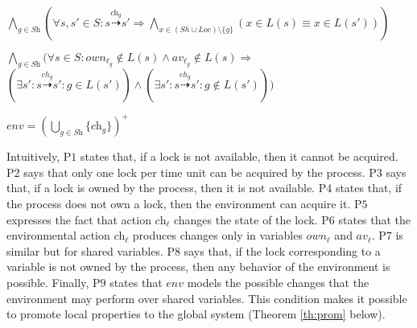 \begin{description}[font=\normalfont]
	\item[P7.] $\bigwedge_{g  \in \textit{Sh}}(\forall  s,s' \in S : s \overset{\textit{ch}_g}{\dashrightarrow} s' \Rightarrow \bigwedge_{x \in (Sh \cup Loc) \setminus \{g\}}(x \in L(s) \equiv x \in L(s')))$
	
	\item[P8.] $\bigwedge_{g \in \textit{Sh}}(\forall s \in S :  \textit{own}_{\ell_g} \notin L(s) \wedge \textit{av}_{\ell_g} \notin L(s) \Rightarrow$ \\
			\hspace*{3cm}$(\exists s': s \overset{ch_g}{\dashrightarrow} s' : g \in L(s')) \wedge  (\exists s': s \overset{ch_g}{\dashrightarrow} s' : g \notin L(s')))$
	
	\item[P9.] $\textit{env} = (\bigcup_{g \in \textit{Sh}}\{\textit{ch}_g\})^+$
\end{description}
Intuitively, $\text{P1}$ states that, if a lock is not available, then it cannot be acquired. $\text{P2}$ says that only one lock per time unit can be acquired by the process. $\text{P3}$
says that, if a lock is owned by the process, then it is not available. $\text{P4}$ states that, if the process does not own a lock, then the environment can acquire it. $\text{P5}$ expresses the fact that 
action $\textit{ch}_\ell$ changes the state of the lock. $\text{P6}$ states that the environmental action $\textit{ch}_\ell$ produces changes only in variables $\textit{own}_\ell$ and $\textit{av}_\ell$. $\text{P7}$ is similar but for shared variables.
$\text{P8}$ says that, if the lock corresponding to a variable is not owned by the process, then any behavior of the environment is possible. Finally, $\text{P9}$ states that $\textit{env}$ models the possible changes that the environment may perform over shared variables. This condition makes it possible to promote local properties to the global system (Theorem \ref{th:prom} below).%

